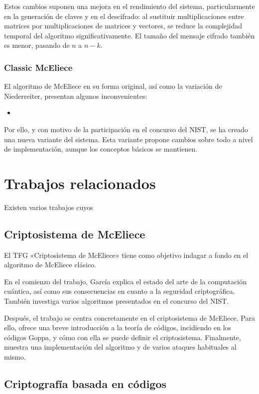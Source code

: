 Estos cambios suponen una mejora en el rendimiento del sistema, particularmente en la generación de claves y en el descifrado: al sustituir multiplicaciones entre matrices por multiplicaciones de matrices y vectores, se reduce la complejidad temporal del algoritmo significativamente. El tamaño del mensaje cifrado también es menor, pasando de $n$ a $n-k$.

\subsubsection{Classic McEliece}

El algoritmo de McEliece en su forma original, así como la variación de Niederreiter, presentan algunos inconvenientes:

\begin{itemize}
	\item 
\end{itemize}

Por ello, y con motivo de la participación en el concurso del NIST, se ha creado una nueva variante del sistema. Esta variante propone cambios sobre todo a nivel de implementación, aunque los conceptos básicos se mantienen.

\section{Trabajos relacionados}

Existen varios trabajos cuyos 

\subsection{Criptosistema de McEliece}
El TFG «Criptosistema de McEliece» \autocite{McEliece2021} tiene como objetivo indagar a fondo en el algoritmo de McEliece clásico.

En el comienzo del trabajo, García explica el estado del arte de la computación cuántica, así como sus consecuencias en cuanto a la seguridad criptográfica. También investiga varios algoritmos presentados en el concurso del NIST.

Después, el trabajo se centra concretamente en el criptosistema de McEliece. Para ello, ofrece una breve introducción a la teoría de códigos, incidiendo en los códigos Goppa, y cómo con ella se puede definir el criptosistema. Finalmente, muestra una implementación del algoritmo y de varios ataques habituales al mismo.

\subsection{Criptografía basada en códigos}


